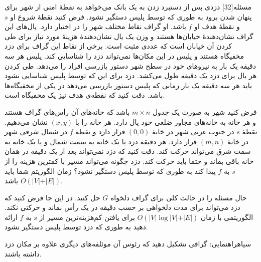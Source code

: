 ‌مسئله[32]
دزدی پس از دستبرد زدن به یک بانک می‌خواهد به نقطۀ امنی از شهر برای پنهان شدن برود به طوری که توسط پلیس دستگیر نشود. فرض کنید نقطۀ شروع او $s$ و نقطۀ هدف او $f$ باشد. او گراف نقاط مختلف شهر را در اختیار دارد. یال‌های این گراف نشان‌دهندۀ خیابان‌ها هستند و وزن یک یال نشان‌دهندۀ هزینۀ مورد نیاز برای طی کردن آن خیابان است که عددی مثبت است. برخی از نقاط این گراف برای دزد مخفیگاه هستند و پلیس در این مکان‌ها نمی‌تواند دزد را شناسایی کند. پلیس هر سه دقیقه یک بار به نیروهای خود در سطح شهر دستور بازرسی افراد را می‌دهد. طی کردن هر یال برای دزد یک دقیقه طول می‌کشد. دزد برای این که توسط پلیس شناسایی نشود باید هر سه دقیقه یک بار زمانی که پلیس دستور بازرسی می‌دهد در یکی از مخفیگاه‌ها باشد. دقت کنید که نقطه‌ی هدف نیز یک مخفیگاه است.


فرض کنید شهر به صورت یک جدول $m\times n$ باشد که خانه‌های آن رأس‌های گراف هستند و هر خانه به خانه‌های مجاور ضلعی خود یال دارد. هر خانه را با $(x, y)$ نشان می‌دهیم. نقطۀ $s$ در جنوب غربی شهر در خانۀ $(0, 0)$ قرار دارد و نقطۀ $f$ در شمال شرقی شهر در خانۀ $(m, n)$ قرار دارد. هر دقیقه دزد یا یک خانه به سمت شمال و یا یک خانه به سمت شرق می‌تواند حرکت کند. دقت کنید که دزد نمی‌تواند بعد از یک دقیقه در همان خانه باقی بماند و حتما باید حرکت کند. دزد چگونه می‌تواند مسیر با کمترین هزینه را از $s$ به $f$ پیدا کند به طوری که توسط پلیس دستگیر نشود؟ زمان الگوریتم شما باید $O(\vert V \vert +  \vert E \vert)$ باشد.

حال مسئله را در حالت کلی برای گراف دلخواه $G$ حل کنید. در این جا فرض کنید که دزد می‌تواند برای مدت دلخواهی بر حسب دقیقه در یک رأس بماند و حرکتی نکند. الگوریتمی با زمان $O(\vert V \vert \log\vert V \vert +  \vert E \vert)$ برای یافتن کم‌هزینه‌ترین مسیر از $s$ به $f$ ارائه دهید به طوری که دزد توسط پلیس دستگیر نشود.

‌سیاه{راهنمایی:}
گرافی تشکیل دهید که رئوس آن موئلفه‌های دیگری علاوه بر مکان دزد داشته باشند.


